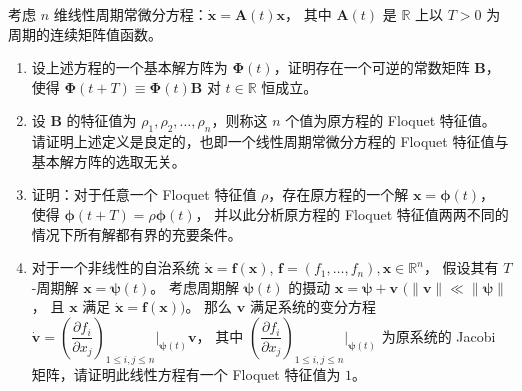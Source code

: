 考虑 $n$ 维线性周期常微分方程：$\dot{\boldsymbol{x}}=\boldsymbol{A}(t) \boldsymbol{x}$，
其中 $\boldsymbol{A}(t)$ 是 $\mathbb{R}$ 上以 $T>0$ 为周期的连续矩阵值函数。
\begin{enumerate}[label=(\arabic*)]
\item 设上述方程的一个基本解方阵为 $\boldsymbol{\Phi}(t)$，证明存在一个可逆的常数矩阵 $\boldsymbol{B}$，
使得 $\boldsymbol{\Phi}(t+T) \equiv \boldsymbol{\Phi}(t) \boldsymbol{B}$ 对 $t \in \mathbb{R}$ 恒成立。
\item 设 $\boldsymbol{B}$ 的特征值为 $\rho_{1}, \rho_{2}, \ldots, \rho_{n}$，则称这 $n$ 个值为原方程的 Floquet 特征值。
请证明上述定义是良定的，也即一个线性周期常微分方程的 Floquet 特征值与基本解方阵的选取无关。
\item 证明：对于任意一个 Floquet 特征值 $\rho$，存在原方程的一个解 $\boldsymbol{x}=\boldsymbol{\phi}(t)$，
使得 $\boldsymbol{\phi}(t+T)=\rho\boldsymbol{\phi}(t)$，
并以此分析原方程的 Floquet 特征值两两不同的情况下所有解都有界的充要条件。
\item 对于一个非线性的自治系统 $\dot{\boldsymbol{x}}=\boldsymbol{f}(\boldsymbol{x})$, 
$\boldsymbol{f}=\left(f_{1}, \ldots, f_{n}\right), \boldsymbol{x} \in \mathbb{R}^{n}$，
假设其有 $T$-周期解 $\boldsymbol{x}=\boldsymbol{\psi}(t)$。
考虑周期解 $\boldsymbol{\psi}(t)$ 的摄动 $\boldsymbol{x}=\boldsymbol{\psi}+\boldsymbol{v}$ $(\|\boldsymbol{v}\| \ll\|\boldsymbol{\psi}\|$，
且 $\boldsymbol{x}$ 满足 $\dot{\boldsymbol{x}}=\boldsymbol{f}(\boldsymbol{x}))$。
那么 $\boldsymbol{v}$ 满足系统的变分方程 $\dot{\boldsymbol{v}}=\left(\dfrac{\partial f_{i}}{\partial x_{j}}\right)_{1 \leq i, j \leq n}\bigg|_{\boldsymbol{\psi}(t)} \boldsymbol{v}$，
其中 $\left(\dfrac{\partial f_{i}}{\partial x_{j}}\right)_{1 \leq i, j \leq n}\bigg|_{\boldsymbol{\psi}(t)}$ 为原系统的 Jacobi 矩阵，请证明此线性方程有一个 Floquet 特征值为 $1$。
\end{enumerate}

